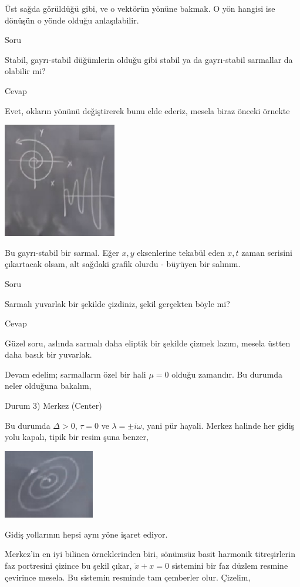 \documentclass[12pt,fleqn]{article}\usepackage{../../common}
\begin{document}
Üst sağda görüldüğü gibi, ve o vektörün yönüne bakmak. O yön hangisi ise dönüşün
o yönde olduğu anlaşılabilir.

Soru

Stabil, gayrı-stabil düğümlerin olduğu gibi stabil ya da gayrı-stabil
sarmallar da olabilir mi?

Cevap

Evet, okların yönünü değiştirerek bunu elde ederiz, mesela biraz önceki örnekte

\includegraphics[height=5cm]{05_16.png}

Bu gayrı-stabil bir sarmal. Eğer $x,y$ eksenlerine tekabül eden $x,t$ zaman
serisini çıkartacak olsam, alt sağdaki grafik olurdu - büyüyen bir salınım.

Soru

Sarmalı yuvarlak bir şekilde çizdiniz, şekil gerçekten böyle mi?

Cevap

Güzel soru, aslında sarmalı daha eliptik bir şekilde çizmek lazım, mesela üstten
daha basık bir yuvarlak.

Devam edelim; sarmalların özel bir hali $\mu = 0$ olduğu zamandır. Bu durumda
neler olduğuna bakalım,

Durum 3) Merkez (Center)

Bu durumda $\Delta > 0$, $\tau = 0$ ve $\lambda = \pm i\omega$, yani pür
hayali. Merkez halinde her gidiş yolu kapalı, tipik bir resim şuna benzer,

\includegraphics[height=3cm]{05_17.png}

Gidiş yollarının hepsi aynı yöne işaret ediyor.  

Merkez'in en iyi bilinen örneklerinden biri, sönümsüz basit harmonik
titreşirlerin faz portresini çizince bu şekil çıkar, $\ddot{x} + x = 0$
sistemini bir faz düzlem resmine çevirince mesela. Bu sistemin resminde tam
çemberler olur. Çizelim, 
\end{document}

